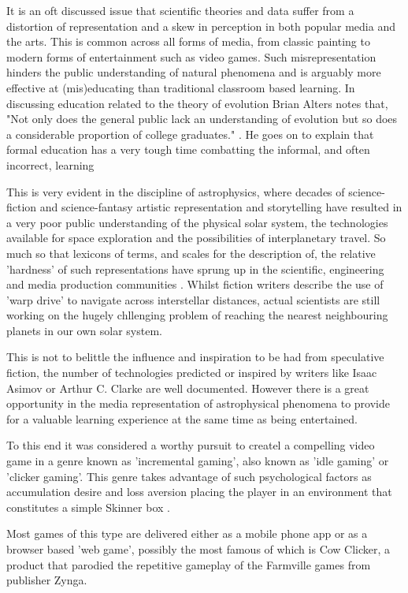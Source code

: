 \documentclass[twoside]{bhamthesis}
\begin{document}
It is an oft discussed issue that scientific theories and data suffer from a distortion of representation and a skew in perception in both popular media and the arts. This is common across all forms of media, from classic painting to modern forms of entertainment such as video games. Such misrepresentation hinders the public understanding of natural phenomena and is arguably more effective at (mis)educating than traditional classroom based learning. In discussing education related to the theory of evolution Brian Alters notes that, "Not only does the general public lack an understanding of evolution but so does a considerable proportion of college graduates." \cite{alters_perspective:_2002}. He goes on to explain that formal education has a very tough time combatting the informal, and often incorrect, learning 

This is very evident in the discipline of astrophysics, where decades of science-fiction and science-fantasy artistic representation and storytelling have resulted in a very poor public understanding of the physical solar system, the technologies available for space exploration and the possibilities of interplanetary travel. So much so that lexicons of terms, and scales for the description of, the relative 'hardness' of such representations have sprung up in the scientific, engineering and media production communities \cite{_mohs_????}. Whilst fiction writers describe the use of 'warp drive' to navigate across interstellar distances, actual scientists are still working on the hugely chllenging problem of reaching the nearest neighbouring planets in our own solar system.

This is not to belittle the influence and inspiration to be had from speculative fiction, the number of technologies predicted or inspired by writers like Isaac Asimov or Arthur C. Clarke are well documented. However there is a great opportunity in the media representation of astrophysical phenomena to provide for a valuable learning experience at the same time as being entertained.

To this end it was considered a worthy pursuit to createl a compelling video game in a genre known as 'incremental gaming', also known as 'idle gaming' or 'clicker gaming'. This genre takes advantage of such psychological factors  as accumulation desire and loss aversion placing the player in an environment that constitutes a simple Skinner box \cite{carlson_psychology:_2009}.

Most games of this type are delivered either as a mobile phone app or as a browser based 'web game', possibly the most famous of which is Cow Clicker, a product that parodied the repetitive gameplay of the Farmville games from publisher Zynga.
\end{document}
